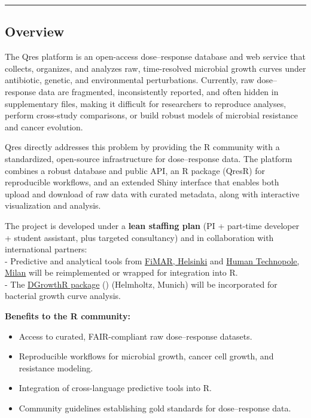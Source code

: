 \documentclass[
]{article}
\providecommand{\tightlist}{%
  \setlength{\itemsep}{0pt}\setlength{\parskip}{0pt}}
\begin{document}
\begin{center}\rule{0.5\linewidth}{0.5pt}\end{center}

\subsection{Overview}\label{overview}

The Qres platform is an open-access dose--response database and web
service that collects, organizes, and analyzes raw, time-resolved
microbial growth curves under antibiotic, genetic, and environmental
perturbations. Currently, raw dose--response data are fragmented,
inconsistently reported, and often hidden in supplementary files, making
it difficult for researchers to reproduce analyses, perform cross-study
comparisons, or build robust models of microbial resistance and cancer
evolution.

Qres directly addresses this problem by providing the R community with a
standardized, open-source infrastructure for dose--response data. The
platform combines a robust database and public API, an R package (QresR)
for reproducible workflows, and an extended Shiny interface that enables
both upload and download of raw data with curated metadata, along with
interactive visualization and analysis.

The project is developed under a \textbf{lean staffing plan} (PI +
part-time developer + student assistant, plus targeted consultancy) and
in collaboration with international partners:\\
- Predictive and analytical tools from
\href{https://www.fimar.fi/}{FiMAR, Helsinki} and
\href{https://humantechnopole.it/en/}{Human Technopole, Milan} will be
reimplemented or wrapped for integration into R.\\
- The \href{https://bio-datascience.github.io/DGrowthR/}{DGrowthR
package} ()
(Helmholtz, Munich) will be incorporated for bacterial growth curve
analysis.

\textbf{Benefits to the R community:}

\begin{itemize}
\tightlist
\item
  Access to curated, FAIR-compliant raw dose--response datasets.
\item
  Reproducible workflows for microbial growth, cancer cell growth, and
  resistance modeling.
\item
  Integration of cross-language predictive tools into R.
\item
  Community guidelines establishing gold standards for dose--response
  data.
\end{itemize}
\end{document}
